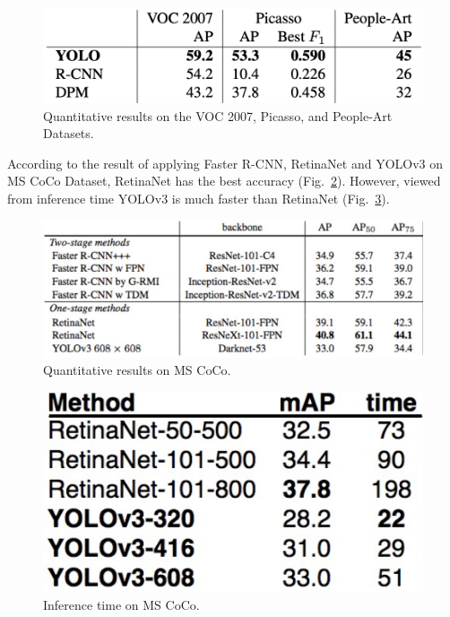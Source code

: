 \documentclass[letterpaper]{article} %
\begin{document}
\begin{figure}[ht]
\hspace{-12mm}
\centering
\includegraphics[scale = 0.4]{Figure/Results_1.png}
\caption{\footnotesize{Quantitative results on the VOC 2007, Picasso, and People-Art Datasets.\footnotemark}}
\label{fig:R_1}
\vspace{-2mm}
\end{figure}
\noindent According to the result of applying Faster R-CNN, RetinaNet and YOLOv3 on MS CoCo Dataset, RetinaNet has the best accuracy (Fig.~\ref{fig:R_2}). However, viewed from inference time YOLOv3 is much faster than RetinaNet (Fig.~\ref{fig:R_3}).
\begin{figure}[ht]
\hspace{-10mm}
\centering
\includegraphics[scale = 0.2]{Figure/Result_2.jpg}
\caption{\footnotesize{Quantitative results on MS CoCo.}}
\label{fig:R_2}
\vspace{0mm}
\end{figure}
\begin{figure}[ht]
\hspace{-10mm}
\centering
\includegraphics[scale = 0.5]{Figure/Result_3.jpg}
\caption{\footnotesize{Inference time on MS CoCo.}}
\label{fig:R_3}
\vspace{-5mm}
\end{figure}
\end{document}
